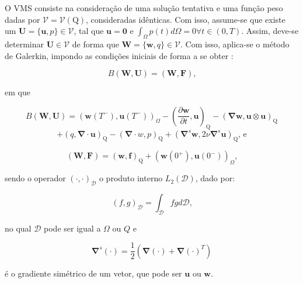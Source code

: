\documentclass[_ArquivoPrincipal.tex]{subfiles}
\begin{document}
O VMS consiste na consideração de uma solução tentativa e uma função peso dadas por $\mathcal{V}=\mathcal{V}(\mathrm{Q})$, consideradas idênticas. Com isso, assume-se que existe um $\mathbf{U}=\{\mathbf{u},p\}\in\mathcal{V}$, tal que $\mathbf{u}=\mathbf{0}$ e $\int_{\Omega}{p(t)d\Omega}=0\forall t\in(0,T)$. Assim, deve-se determinar $\mathbf{U}\in\mathcal{V}$ de forma que $\mathbf{W}=\{\mathbf{w},q\}\in\mathcal{V}$. Com isso, aplica-se o método de Galerkin, impondo as condições iniciais de forma a se obter \cite{hughes2002variational}:

\begin{equation}
    B(\mathbf{W},\mathbf{U})=(\mathbf{W},\mathbf{F})\text{,}
    \label{B}
\end{equation}

\noindent em que

\[
B(\mathbf{W},\mathbf{U})=(\mathbf{w}(T^-),\mathbf{u}(T^-))_\Omega
-\left(\frac{\partial\mathbf{w}}{\partial t},\mathbf{u}\right)_\mathrm{Q}
-\left(\mathbf{\nabla}\mathbf{w},\mathbf{u}\otimes\mathbf{u}\right)_\mathrm{Q}\]
\begin{equation}
    +\left(q,\mathbf{\nabla}\cdot\mathbf{u}\right)_\mathrm{Q}
    -\left(\mathbf{\nabla}\cdot w,p\right)_\mathrm{Q}
    +\left(\mathbf{\nabla}^s\mathbf{w},2\nu\mathbf{\nabla}^s\mathbf{u}\right)_\mathrm{Q}\text{, e}
    \label{B-2}
\end{equation}

\begin{equation}
    (\mathbf{W},\mathbf{F})=(\mathbf{w},\mathbf{f})_\mathrm{Q}+(\mathbf{w}(0^+),\mathbf{u}(0^-))_\Omega\text{,}
    \label{WF}
\end{equation}

\noindent sendo o operador $(\cdot,\cdot)_\mathcal{D}$ o produto interno $L_2(\mathcal{D})$, dado por:

\begin{equation}
    (f,g)_\mathcal{D}=\int_\mathcal{D}{fgd\mathcal{D}}\text{,}
    \label{L2}
\end{equation}

\noindent no qual $\mathcal{D}$ pode ser igual a $\Omega$ ou $Q$ e \cite{bazilevs2010large}

\begin{equation}
    \mathbf{\nabla}^s(\mathbf{\cdot})=\frac{1}{2}(\mathbf{\nabla}(\mathbf{\cdot})+\mathbf{\nabla}(\mathbf{\cdot})^T)
    \label{nablas}
\end{equation}

\noindent é o gradiente simétrico de um vetor, que pode ser $\mathbf{u}$ ou $\mathbf{w}$.
\end{document}
